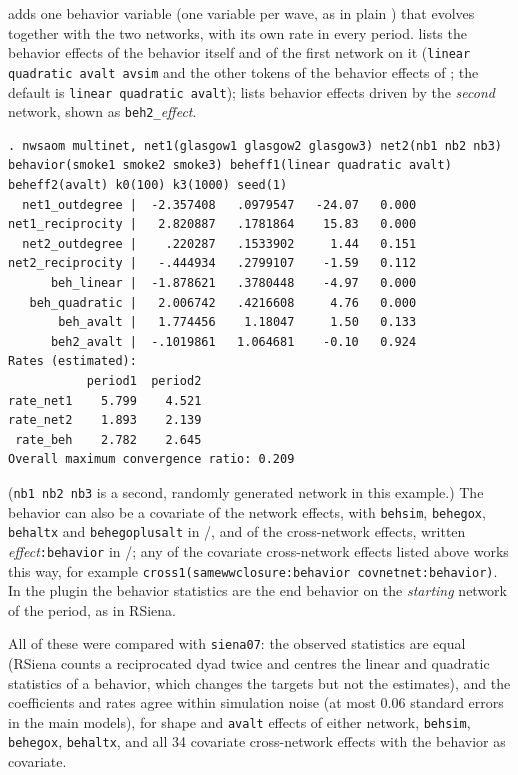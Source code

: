  adds one behavior variable (one variable per wave, as in plain \nwsaom{}) that evolves together with the two networks, with its own rate in every period.  lists the behavior effects of the behavior itself and of the first network on it (\texttt{linear quadratic avalt avsim} and the other tokens of the behavior effects of \nwsaom{}; the default is \texttt{linear quadratic avalt});  lists behavior effects driven by the \emph{second} network, shown as \texttt{beh2\_}\emph{effect}.
\begin{lstlisting}
. nwsaom multinet, net1(glasgow1 glasgow2 glasgow3) net2(nb1 nb2 nb3) behavior(smoke1 smoke2 smoke3) beheff1(linear quadratic avalt) beheff2(avalt) k0(100) k3(1000) seed(1)
  net1_outdegree |  -2.357408   .0979547   -24.07   0.000
net1_reciprocity |   2.820887   .1781864    15.83   0.000
  net2_outdegree |    .220287   .1533902     1.44   0.151
net2_reciprocity |   -.444934   .2799107    -1.59   0.112
      beh_linear |  -1.878621   .3780448    -4.97   0.000
   beh_quadratic |   2.006742   .4216608     4.76   0.000
       beh_avalt |   1.774456    1.18047     1.50   0.133
      beh2_avalt |  -.1019861   1.064681    -0.10   0.924
Rates (estimated):
           period1  period2
rate_net1    5.799    4.521
rate_net2    1.893    2.139
 rate_beh    2.782    2.645
Overall maximum convergence ratio: 0.209
\end{lstlisting}
(\texttt{nb1 nb2 nb3} is a second, randomly generated network in this example.) The behavior can also be a covariate of the network effects, with \texttt{behsim}, \texttt{behegox}, \texttt{behaltx} and \texttt{behegoplusalt} in /, and of the cross-network effects, written \emph{effect}\texttt{:behavior} in /; any of the covariate cross-network effects listed above works this way, for example \texttt{cross1(samewwclosure:behavior covnetnet:behavior)}. In the plugin the behavior statistics are the end behavior on the \emph{starting} network of the period, as in RSiena.

All of these were compared with \texttt{siena07}: the observed statistics are equal (RSiena counts a reciprocated dyad twice and centres the linear and quadratic statistics of a behavior, which changes the targets but not the estimates), and the coefficients and rates agree within simulation noise (at most 0.06 standard errors in the main models), for shape and \texttt{avalt} effects of either network, \texttt{behsim}, \texttt{behegox}, \texttt{behaltx}, and all 34 covariate cross-network effects with the behavior as covariate.

